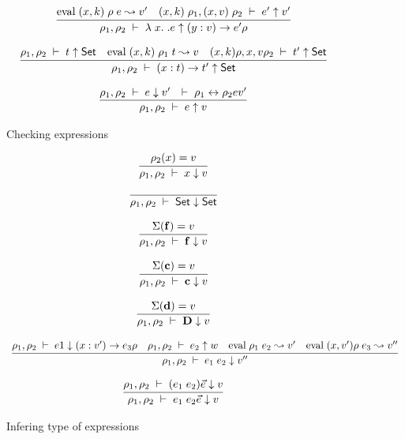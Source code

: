 \begin{figure}[p]
\[\begin{array}{c}
	  \infer{\Check{\rho_1}{\rho_2}{\lam x . e}{\EPi{y}{v}{e'}{\rho}}}
          { \Eval{(x,k)\;\rho}{e}{v'} & \Check{(x,k)\;\rho_1}{(x,v)\;\rho_2}{e'}{v'}} 
\end{array}
\]

\[\begin{array}{c}
	  \infer{\Check{\rho_1}{\rho_2}{\EPi{x}{t}{t'}}{\Set}}
          {\IsType{\rho_1}{\rho_2}{t}  
	    & \Eval{(x,k)\;\rho_1}{t}{v}
	    & \IsType{(x,k)\rho}{{x,v}\rho_2}{t'}}
\end{array}
\]

\[\begin{array}{c}
	  \infer{\Check{\rho_1}{\rho_2}{e}{v}} 
          { \Infer{\rho_1}{\rho_2}{e}{v'} & \EqVal{\rho_1}{\rho_2}{e}{v'}} 
\end{array}
\]
\caption{Checking expressions}
\end{figure}

\begin{figure}[p]
\[\begin{array}{c}
	  \infer{\Infer{\rho_1}{\rho_2}{x}{v}} 
          {\Lookup{\rho_2}{x}{v}}
\end{array}
\]

\[\begin{array}{c}
	  \infer{\Infer{\rho_1}{\rho_2}{\Set}{\Set}} 
          {}
\end{array}
\]

\[\begin{array}{c}
	  \infer{\Infer{\rho_1}{\rho_2}{\ff}{v}} 
          {\Lookup{\Sigma}{\ff}{v}}
\end{array}
\]

\[\begin{array}{c}
	  \infer{\Infer{\rho_1}{\rho_2}{\cc}{v}} 
          {\Lookup{\Sigma}{\cc}{v}}
\end{array}
\]

\[\begin{array}{c}
	  \infer{\Infer{\rho_1}{\rho_2}{\DD}{v}} 
          {\Lookup{\Sigma}{\dd}{v}}
\end{array}
\]

\[\begin{array}{c}
	  \infer{\Infer{\rho_1}{\rho_2}{e_1 \; e_2}{v''}}
{\Infer{\rho_1}{\rho_2}{e1}{\EPi{x}{v'}{e_3}{\rho}}
& \Check{\rho_1}{\rho_2}{e_2}{w}
& \Eval{\rho_1}{e_2}{v'}
& \Eval{(x,v')\rho}{e_3}{v''}}

\end{array}
\]

\[\begin{array}{c}
	  \infer{\Infer{\rho_1}{\rho_2}{e_1 \; e_2 \vec{e}}{v}
	  } 
          {\Infer{\rho_1}{\rho_2}{(e_1 \; e_2) \vec{e}}{v}}
\end{array}
\]



\caption{Infering type of expressions}
\end{figure}


